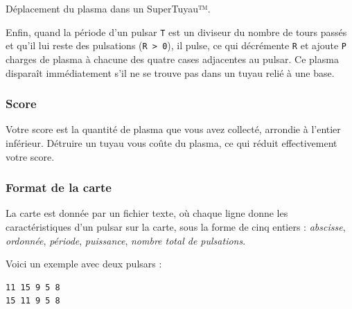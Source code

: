 Déplacement du plasma dans un SuperTuyau™.


Enfin, quand la période d'un pulsar \texttt{T} est un diviseur du nombre
de tours passés et qu'il lui reste des pulsations
(\texttt{R\ \textgreater{}\ 0}), il pulse, ce qui décrémente \texttt{R}
et ajoute \texttt{P} charges de plasma à chacune des quatre cases
adjacentes au pulsar. Ce plasma disparaît immédiatement s'il ne se
trouve pas dans un tuyau relié à une base.

\subsubsection{Score}\label{score}

Votre score est la quantité de plasma que vous avez collecté, arrondie à
l'entier inférieur. Détruire un tuyau vous coûte du plasma, ce qui
réduit effectivement votre score.

\subsubsection{Format de la carte}\label{format-de-la-carte}

La carte est donnée par un fichier texte, où chaque ligne donne les
caractéristiques d'un pulsar sur la carte, sous la forme de cinq entiers
: \emph{abscisse}, \emph{ordonnée}, \emph{période}, \emph{puissance},
\emph{nombre total de pulsations}.

Voici un exemple avec deux pulsars :

\begin{verbatim}
11 15 9 5 8
15 11 9 5 8
\end{verbatim}
